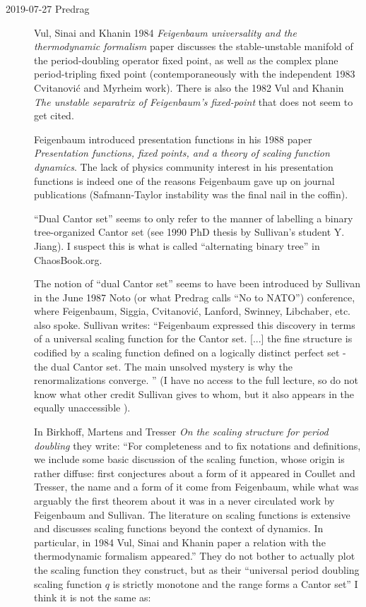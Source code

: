 \begin{description}
  \item[2019-07-27 Predrag]
Vul, Sinai and Khanin 1984 {\em Feigenbaum universality and
the thermodynamic formalism} paper discusses the stable-unstable manifold
of the period-doubling operator fixed point, as well as the complex plane
period-tripling fixed point (contemporaneously with the independent 1983
Cvitanovi{\'c} and Myrheim work). There is also the
1982 Vul and Khanin {\em The unstable separatrix of
{Feigenbaum}'s fixed-point} that does not seem to get cited.

Feigenbaum introduced presentation functions in his 1988
paper {\em Presentation functions, fixed points, and a
theory of scaling function dynamics}. The lack of physics community
interest in his presentation functions is indeed one of the reasons
Feigenbaum gave up on journal publications
(Safmann-Taylor instability was the final nail in the
coffin).

``Dual Cantor set'' {seems to only} refer to the manner of labelling a
binary tree-organized Cantor set (see 1990 PhD thesis by Sullivan's
student
{Y. Jiang}). I suspect this is what is called ``alternating  binary
tree'' in
{ChaosBook.org}.

The notion of ``dual Cantor set'' seems to have been introduced by
Sullivan in the June 1987 Noto (or what Predrag calls ``No
to NATO'') conference, where Feigenbaum, Siggia,
Cvitanovi{\'c}, Lanford, Swinney, Libchaber, etc. also spoke. Sullivan
writes: ``Feigenbaum expressed this discovery in terms of a universal
scaling function for the Cantor set. [...] the fine structure is codified
by a scaling function defined on a logically distinct perfect set - the
dual Cantor set. The main unsolved mystery is why the renormalizations
converge. '' (I have no access to the full lecture, so do not know what
other credit Sullivan gives to whom, but it also appears in the equally
unaccessible ).

In Birkhoff, Martens and Tresser
{\em On the scaling structure for period doubling} they write:
``For  completeness  and  to fix notations  and  definitions,  we include
some  basic discussion  of the scaling function,  whose origin is rather
diffuse:  first  conjectures  about a form  of it  appeared  in Coullet
and Tresser, the name and a  form  of it  come from
Feigenbaum, while what  was  arguably the first theorem
about  it was in a never circulated  work by Feigenbaum  and  Sullivan.
The literature  on  scaling functions  is  extensive  and  discusses
scaling functions  beyond  the context  of dynamics.  In  particular,  in
1984 Vul, Sinai and Khanin paper  a  relation  with  the
thermodynamic  formalism  appeared.''
They do not bother to actually plot the scaling function they construct,
but as their ``universal period doubling scaling function $q$ is strictly
monotone and the range forms a Cantor set'' I think it is not the same
as:


\end{description}
